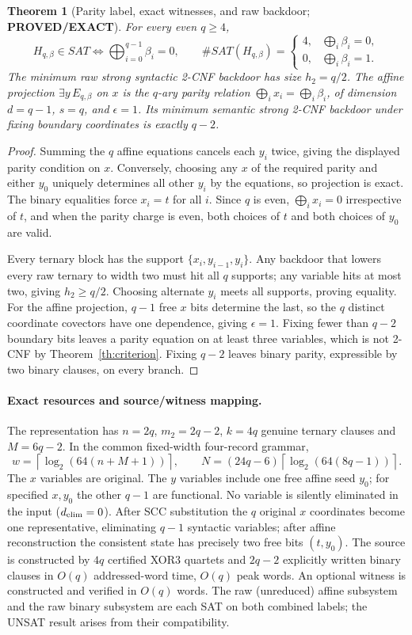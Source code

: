 \documentclass[11pt]{article}
\newtheorem{theorem}{Theorem}
\newcommand{\PROVED}{\textbf{PROVED/EXACT}}
\begin{document}
\begin{theorem}[Parity label, exact witnesses, and raw backdoor; \PROVED]
For every even $q\ge4$,
\[
H_{q,\beta}\in SAT\iff\bigoplus_{i=0}^{q-1}\beta_i=0,\qquad
\#SAT(H_{q,\beta})=
\begin{cases}4,&\bigoplus_i\beta_i=0,\\0,&\bigoplus_i\beta_i=1.\end{cases}
\tag{6}
\]
The minimum raw strong syntactic 2-CNF backdoor has size $h_2=q/2$.
The affine projection $\exists y\,E_{q,\beta}$ on $x$ is the
$q$-ary parity relation $\bigoplus_ix_i=\bigoplus_i\beta_i$,
of dimension $d=q-1$, $s=q$, and $\epsilon=1$.
Its minimum \emph{semantic} strong 2-CNF backdoor under fixing
boundary coordinates is exactly $q-2$.
\end{theorem}
\begin{proof}
Summing the $q$ affine equations cancels each $y_i$ twice,
giving the displayed parity condition on $x$. Conversely,
choosing any $x$ of the required parity and either $y_0$ uniquely
determines all other $y_i$ by the equations, so projection is exact.
The binary equalities force $x_i=t$ for all $i$. Since $q$ is even,
$\bigoplus_i x_i=0$ irrespective of $t$, and when the parity charge is
even, both choices of $t$ and both choices of $y_0$ are valid.

Every ternary block has the support $\{x_i,y_{i-1},y_i\}$.
Any backdoor that lowers every raw ternary to width two must hit all
$q$ supports; any variable hits at most two, giving $h_2\ge q/2$.
Choosing alternate $y_i$ meets all supports, proving equality.
For the affine projection, $q-1$ free $x$ bits determine the last,
so the $q$ distinct coordinate covectors have one dependence,
giving $\epsilon=1$. Fixing fewer than $q-2$ boundary bits
leaves a parity equation on at least three variables, which is not
2-CNF by Theorem~\ref{th:criterion}. Fixing $q-2$ leaves binary
parity, expressible by two binary clauses, on every branch.
\end{proof}

\paragraph{Exact resources and source/witness mapping.}
The representation has $n=2q$, $m_2=2q-2$, $k=4q$ genuine ternary
clauses and $M=6q-2$. In the common fixed-width four-record grammar,
\[
w=\left\lceil\log_2(64(n+M+1))\right\rceil,\qquad
N=(24q-6)\left\lceil\log_2(64(8q-1))\right\rceil. \tag{7}
\]
The $x$ variables are original. The $y$ variables include one
free affine seed $y_0$; for specified $x,y_0$ the other $q-1$
are functional. No variable is silently eliminated in the input
($d_{\rm elim}=0$). After SCC substitution the $q$ original $x$
coordinates become one representative, eliminating $q-1$
syntactic variables; after affine reconstruction the consistent
state has precisely two free bits $(t,y_0)$.
The source is constructed by $4q$ certified XOR3 quartets and
$2q-2$ explicitly written binary clauses in $O(q)$ addressed-word
time, $O(q)$ peak words. An optional witness is constructed and
verified in $O(q)$ words. The raw (unreduced) affine subsystem and
the raw binary subsystem are each SAT on both combined labels;
the UNSAT result arises from their compatibility.
\end{document}
